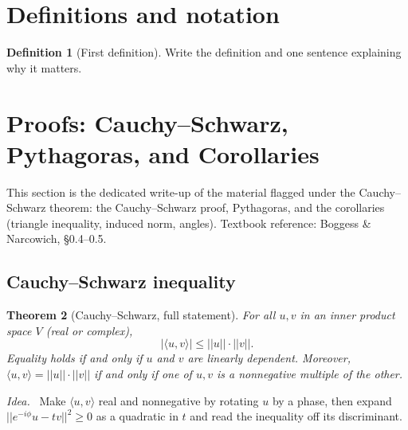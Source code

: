 \documentclass[11pt]{article}
\newcommand{\1}{\mathbf{1}}
\theoremstyle{notestyle}
\newtheorem{theorem}{Theorem}[section]
\theoremstyle{definition}
\newtheorem{definition}[theorem]{Definition}
\newenvironment{idea}{\par\noindent\textit{Idea.}\ }{\par}
\begin{document}
\section{Definitions and notation}
\begin{definition}[First definition]
Write the definition and one sentence explaining why it matters.
\end{definition}

\section{Proofs: Cauchy--Schwarz, Pythagoras, and Corollaries}
This section is the dedicated write-up of the material flagged under the
Cauchy--Schwarz theorem: the Cauchy--Schwarz proof, Pythagoras, and the corollaries
(triangle inequality, induced norm, angles). Textbook reference: Boggess \&
Narcowich, \S0.4--0.5.

\subsection{Cauchy--Schwarz inequality}
\begin{theorem}[Cauchy--Schwarz, full statement]
\label{thm:cs-full}
For all $u, v$ in an inner product space $V$ (real or complex),
$$|\langle u, v\rangle| \le ||u|| \cdot ||v||.$$
Equality holds if and only if $u$ and $v$ are linearly dependent. Moreover,
$\langle u, v\rangle = ||u|| \cdot ||v||$ if and only if one of $u, v$ is a
nonnegative multiple of the other.
\end{theorem}

\begin{idea}
Make $\langle u, v\rangle$ real and nonnegative by rotating $u$ by a phase, then
expand $||e^{-i\phi}u - tv||^2 \ge 0$ as a quadratic in $t$ and read the inequality
off its discriminant.
\end{idea}
\end{document}
